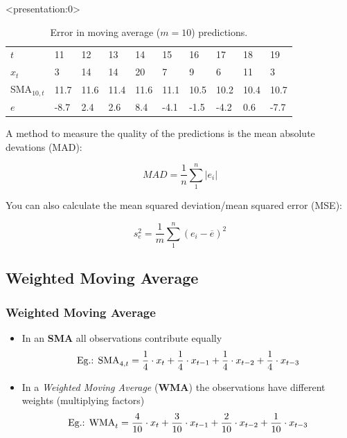 \documentclass{beamer}
\begin{document}
\begin{frame}<presentation:0> %
  \begin{table}
    \begin{tabular}{|llllllllll|}
      \hline
      $t$       & 11   & 12   & 13   & 14   & 15   & 16   & 17   & 18   & 19   \\
      $x_{t}$ & 3    & 14   & 14   & 20   & 7    & 9    & 6    & 11   & 3    \\
      SMA$_{10,t}$ & 11.7 & 11.6 & 11.4 & 11.6 & 11.1 & 10.5 & 10.2 & 10.4 & 10.7 \\
      $e$     & -8.7 & 2.4  & 2.6  & 8.4  & -4.1 & -1.5 & -4.2 & 0.6  & -7.7 \\ \hline
    \end{tabular}
    \caption{Error in moving average ($m = 10$) predictions.}
    \label{tab:error}
\end{table}

A method to measure the quality of the predictions is the mean absolute devations (MAD):

\begin{equation}
  MAD = \frac{1}{n} \sum_{1}^{n} \left| e_{i} \right|
\label{eq:MAD}
\end{equation}

You can also calculate the mean squared deviation/mean squared error (MSE):

\begin{equation}
  s^{2}_{e} = \frac{1}{m} \sum_{1}^{n} (e_{i} - \overline{e})^{2}
\label{eq:varError}
\end{equation}
\end{frame}

\subsection{Weighted Moving Average}

\begin{frame}
  \frametitle{Weighted Moving Average}

  \begin{itemize}
    \item In an \textbf{SMA} all observations contribute equally
    \[ \textnormal{Eg.: SMA}_{4,t} = \frac{1}{4} \cdot x_{t} + \frac{1}{4} \cdot x_{t-1} +
\frac{1}{4} \cdot x_{t-2} + \frac{1}{4} \cdot x_{t-3} \]
\vfill
    \item In a \textit{Weighted Moving Average} (\textbf{WMA}) the observations have different weights (multiplying factors)
    \[ \textnormal{Eg.: WMA}_t = \frac{4}{10} \cdot x_{t} + \frac{3}{10} \cdot x_{t-1} +
\frac{2}{10} \cdot x_{t-2} + \frac{1}{10} \cdot x_{t-3} \]
  \end{itemize}
\end{frame}
\end{document}
